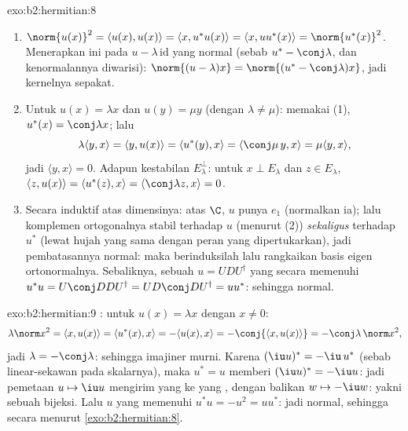 \begin{solution}{exo:b2:hermitian:8}
\begin{enumerate}
  \item $\norm{u(x)}^2 = \langle u(x), u(x)\rangle = \langle x,
        u^*u(x)\rangle = \langle x, uu^*(x)\rangle =
        \norm{u^*(x)}^2$. Menerapkan ini pada $u -
        \lambda\,\mathrm{id}$ yang normal (sebab  $u^* -
        \conj\lambda$, dan kenormalannya diwarisi): $\norm{(u -
        \lambda)x} = \norm{(u^* - \conj\lambda)x}$, jadi kernelnya
        sepakat.
  \item Untuk  $u(x) = \lambda x$ dan $u(y) = \mu y$
        (dengan $\lambda \neq \mu$): memakai (1), $u^*(x) = \conj\lambda x$;
        lalu
        \[
        \lambda\langle y, x\rangle = \langle y, u(x)\rangle
        = \langle u^*(y), x\rangle = \langle \conj\mu\, y, x\rangle
        = \mu \langle y, x\rangle ,
        \]
        jadi $\langle y, x\rangle = 0$. Adapun kestabilan $E_\lambda^\perp$:
        untuk $x \perp E_\lambda$ dan $z \in E_\lambda$, $\langle z,
        u(x)\rangle = \langle u^*(z), x\rangle =
        \langle\conj\lambda z, x\rangle = 0$.
  \item Secara induktif atas dimensinya: atas $\C$, $u$ punya 
        $e_1$ (normalkan ia); lalu komplemen ortogonalnya stabil
        terhadap $u$ (menurut (2)) \emph{sekaligus} terhadap $u^*$ (lewat hujah
        yang sama dengan peran yang dipertukarkan), jadi pembatasannya normal:
        maka berinduksilah lalu rangkaikan basis eigen ortonormalnya. Sebaliknya,
        sebuah $u = UDU^\dagger$ yang  secara  memenuhi $u^*u
        = U\conj D D U^\dagger = U D\conj D U^\dagger = uu^*$:
        sehingga normal.
\end{enumerate}
\end{solution}

\begin{solution}{exo:b2:hermitian:9}
: untuk $u(x) = \lambda x$ dengan $x \neq 0$:
\[
\lambda\norm x^2 = \langle x, u(x)\rangle
= \langle u^*(x), x\rangle = -\langle u(x), x\rangle
= -\conj{\langle x, u(x)\rangle} = -\conj\lambda\,\norm x^2 ,
\]
jadi $\lambda = -\conj\lambda$: sehingga imajiner murni. Karena $(\iu
u)^* = -\iu\,u^*$ (sebab  linear-sekawan pada skalarnya),
maka $u^* = u$ memberi $(\iu u)^* = -\iu u$: jadi pemetaan $u \mapsto \iu u$
mengirim yang  ke yang , dengan balikan $w \mapsto -\iu
w$: yakni sebuah bijeksi. Lalu $u$ yang  memenuhi $u^*u = -u^2 =
uu^*$: jadi normal, sehingga  secara  menurut
\cref{exo:b2:hermitian:8}.
\end{solution}

